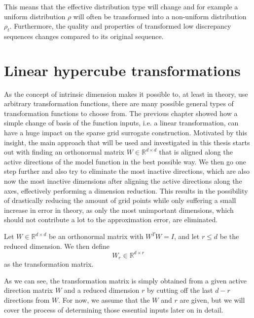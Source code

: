 \documentclass[
  a4paper,  %
  twoside,  %
  bibliography=totoc,
  headsepline,
  cleardoublepage=empty,
  parskip=half,
  draft=false
]{scrbook}
\begin{document}
This means that the effective distribution type will change and for example a uniform distribution $\rho$ will often be transformed into a non-uniform distribution $\rho_t$.
Furthermore, the quality and properties of transformed low discrepancy sequences changes compared to its original sequence.

\section{Linear hypercube transformations}

As the concept of intrinsic dimension makes it possible to, at least in theory, use arbitrary transformation functions, there are many possible general types of transformation functions to choose from.
The previous chapter showed how a simple change of basis of the function inputs, i.e. a linear transformation, can have a huge impact on the sparse grid surrogate construction.
Motivated by this insight, the main approach that will be used and investigated in this thesis starts out with finding an orthonormal matrix $W \in \mathds{R}^{d \times d}$ that is aligned along the active directions of the model function in the best possible way.
We then go one step further and also try to eliminate the most inactive directions, which are also now the most inactive dimensions after aligning the active directions along the axes, effectively performing a dimension reduction.
This results in the possibility of drastically reducing the amount of grid points while only suffering a small increase in error in theory, as only the most unimportant dimensions, which should not contribute a lot to the approximation error, are eliminated.

\begin{definition}
Let $W \in \mathds{R}^{d \times d}$ be an orthonormal matrix with $W^T W=I$, and let $r \leq d$ be the reduced dimension.
We then define
\begin{equation}
W_r \in \mathds{R}^{d \times r}
\end{equation}
as the transformation matrix.
\end{definition}


As we can see, the transformation matrix is simply obtained from a given active direction matrix $W$ and a reduced dimension $r$ by cutting off the last $d - r$ directions from $W$.
For now, we assume that the $W$ and $r$ are given, but we will cover the process of determining those essential inputs later on in detail.
\end{document}
